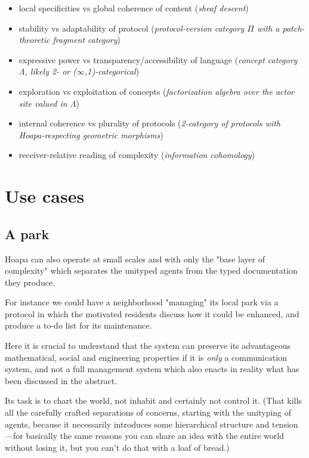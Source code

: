 \documentclass[11pt]{article}
\begin{document}
\begin{itemize}

\item local specificities vs global coherence of content (\emph{sheaf descent})

\item stability vs adaptability of protocol (\emph{protocol-version category \ensuremath{\Pi} with a patch-theoretic fragment category})

\item expressive power vs transparency/accessibility of language (\emph{concept category \ensuremath{\Lambda}, likely 2- or (\ensuremath{\infty},1)-categorical})

\item exploration vs exploitation of concepts (\emph{factorization algebra over the actor site valued in \ensuremath{\Lambda}})

\item internal coherence vs plurality of protocols (\emph{2-category of protocols with Hoapa-respecting geometric morphisms})

\item receiver-relative reading of complexity (\emph{information cohomology})

\end{itemize}

\section{Use cases}

\subsection{A park}

Hoapa can also operate at small scales and with only the "base layer of complexity" which separates the unityped agents from the typed documentation they produce.

For instance we could have a neighborhood "managing" its local park via a protocol in which the motivated residents discuss how it could be enhanced, and produce a to-do list for its maintenance.

Here it is crucial to understand that the system can preserve its advantageous mathematical, social and engineering properties if it is \emph{only} a communication system, and not a full management system which also enacts in reality what has been discussed in the abstract.

Its task is to chart the world, not inhabit and certainly not control it. (That kills all the carefully crafted separations of concerns, starting with the unityping of agents, because it necessarily introduces some hierarchical structure and tension---for basically the same reasons you can share an idea with the entire world without losing it, but you can't do that with a loaf of bread.)
\end{document}
